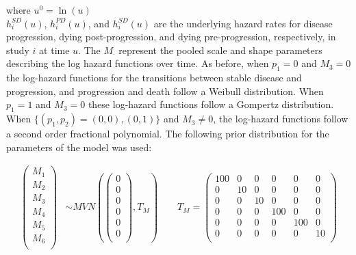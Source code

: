 \documentclass[11pt,final,fleqn]{article}\usepackage[]{graphicx}\usepackage[]{color}
\theoremstyle{plain}
\begin{document}
{where $u^0= \ln(u)$
\\

$h_{i}^{SD}(u)$, $h_{i}^{PD}(u)$, and $h_{i}^{SD}(u)$ are the underlying hazard rates for disease progression, dying post-progression, and dying pre-progression, respectively, in study $i$ at time $u$. The $M_{\cdot}$ represent the pooled scale and shape parameters describing the log hazard functions over time. As before, when $p_{1}=0$ and $M_{3}=0$ the log-hazard functions for the transitions between stable disease and progression, and progression and death follow a Weibull distribution. When $p_{1}=1$ and $M_{3}=0$ these log-hazard functions follow a Gompertz distribution. When $\{(p_1, p_2) = (0, 0), (0,1)\}$ and $M_{3}\neq0$, the log-hazard functions follow a second order fractional polynomial. The following prior distribution for the parameters of the model was used:

\begin{equation} \label{eqn:multistate-ma-priors-gef}
\begin{aligned}
\begin{pmatrix}
M_{1}  \\
M_{2}  \\
M_{3}  \\
M_{4}  \\
M_{5}  \\
M_{6}  \\
\end{pmatrix} 
&\sim 
MVN\left(
\begin{pmatrix}
0  \\
0  \\
0  \\
0  \\
0  \\
0 \\
\end{pmatrix}, 
T_M
\right) 
\qquad
T_M =
\begin{pmatrix}
100 & 0 & 0 & 0 & 0 & 0 \\
0 & 10 & 0 & 0 & 0 & 0 \\
0 & 0 & 10 & 0 & 0 & 0 \\
0 & 0 & 0 & 100 & 0 & 0 \\
0 & 0 & 0 & 0 & 100 & 0 \\
0 & 0 & 0 & 0 & 0 & 10 \\
\end{pmatrix}\\\\
\end{aligned}
\end{equation}

}
\end{document}
